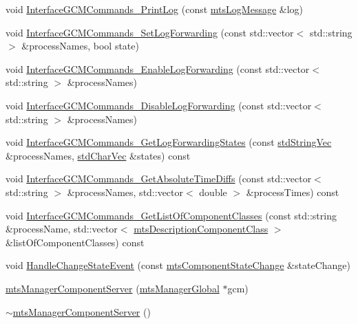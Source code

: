 \begin{DoxyCompactItemize}
\item 
void \hyperlink{classmts_manager_component_server_ab839a8bfcec131ad95a3211c81189913}{Interface\+G\+C\+M\+Commands\+\_\+\+Print\+Log} (const \hyperlink{classmts_log_message}{mts\+Log\+Message} \&log)
\item 
void \hyperlink{classmts_manager_component_server_ae577ba00e3227d38951469ee52a94bb9}{Interface\+G\+C\+M\+Commands\+\_\+\+Set\+Log\+Forwarding} (const std\+::vector$<$ std\+::string $>$ \&process\+Names, bool state)
\item 
void \hyperlink{classmts_manager_component_server_a1019aae9f1b57584d6bd6aebaf04f46b}{Interface\+G\+C\+M\+Commands\+\_\+\+Enable\+Log\+Forwarding} (const std\+::vector$<$ std\+::string $>$ \&process\+Names)
\item 
void \hyperlink{classmts_manager_component_server_a1bef6d6b8723f33d15a78f98e3f3fad9}{Interface\+G\+C\+M\+Commands\+\_\+\+Disable\+Log\+Forwarding} (const std\+::vector$<$ std\+::string $>$ \&process\+Names)
\item 
void \hyperlink{classmts_manager_component_server_a27c2f1fbf13c43eb3baad98eed4ad610}{Interface\+G\+C\+M\+Commands\+\_\+\+Get\+Log\+Forwarding\+States} (const \hyperlink{mts_generic_object_proxy_8h_ae2238149254430b4959aa4e16892fc07}{std\+String\+Vec} \&process\+Names, \hyperlink{mts_generic_object_proxy_8h_a3fcb43cabc338a5aee6772138bee2416}{std\+Char\+Vec} \&states) const 
\item 
void \hyperlink{classmts_manager_component_server_aac8ecf77336d288fb014924dd8637e47}{Interface\+G\+C\+M\+Commands\+\_\+\+Get\+Absolute\+Time\+Diffs} (const std\+::vector$<$ std\+::string $>$ \&process\+Names, std\+::vector$<$ double $>$ \&process\+Times) const 
\item 
void \hyperlink{classmts_manager_component_server_ac4192696d711afd1a13ae5097b4f2148}{Interface\+G\+C\+M\+Commands\+\_\+\+Get\+List\+Of\+Component\+Classes} (const std\+::string \&process\+Name, std\+::vector$<$ \hyperlink{classmts_description_component_class}{mts\+Description\+Component\+Class} $>$ \&list\+Of\+Component\+Classes) const 
\item 
void \hyperlink{classmts_manager_component_server_ae94bfdf1bd661f6e9ae08f60ab064e6f}{Handle\+Change\+State\+Event} (const \hyperlink{classmts_component_state_change}{mts\+Component\+State\+Change} \&state\+Change)
\item 
\hyperlink{classmts_manager_component_server_a76de83e83abbedecc53b7bcbe296d849}{mts\+Manager\+Component\+Server} (\hyperlink{classmts_manager_global}{mts\+Manager\+Global} $\ast$gcm)
\item 
\hyperlink{classmts_manager_component_server_af4ffa495025cd7f60b992f29edb71543}{$\sim$mts\+Manager\+Component\+Server} ()
\end{DoxyCompactItemize}
